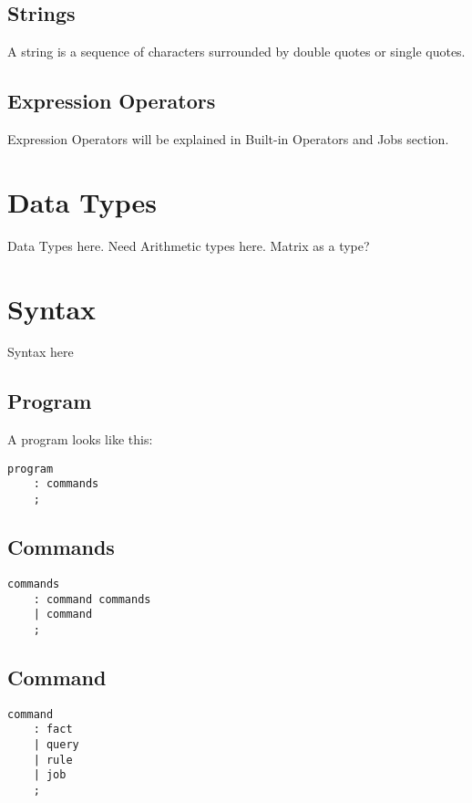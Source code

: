 \documentclass[prodmode,acmtecs]{acmsmall}
\begin{document}
\subsection{Strings}

A string is a sequence of characters surrounded by double quotes or single
quotes.

\subsection{Expression Operators}
Expression Operators will be explained in Built-in Operators and Jobs section.

\section{Data Types}

Data Types here. Need Arithmetic types here. Matrix as a type?

\section{Syntax}

Syntax here

\subsection{Program}

A program looks like this:

\begin{lstlisting}
program
	: commands
	;
\end{lstlisting}


\subsection{Commands}

\begin{lstlisting}
commands
	: command commands
	| command
	;
\end{lstlisting}


\subsection{Command}

\begin{lstlisting}
command
	: fact
	| query
	| rule
	| job
	;
\end{lstlisting}
\end{document}
